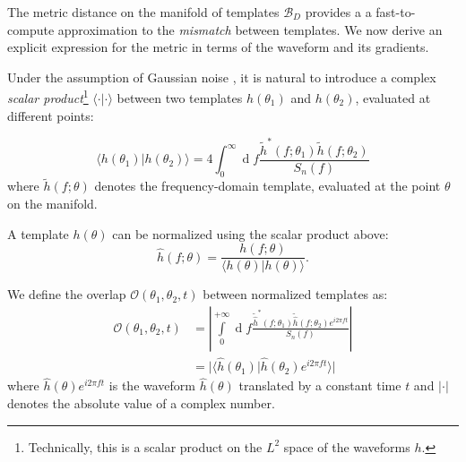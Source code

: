 \documentclass[twocolumn,showpacs,preprintnumbers,nofootinbib,prd,
superscriptaddress,10pt]{revtex4-2}
\renewcommand{\d}[1]{\ensuremath{\operatorname{d}\!{#1}}}
\newcommand{\scalar}[2]{\langle #1|#2 \rangle}
\begin{document}
The metric distance on the manifold of templates $\mathcal{B}_D$ provides a a fast-to-compute approximation to the {\it mismatch} between templates. We now derive an explicit expression for the metric in terms of the waveform and its gradients.

Under the assumption of Gaussian noise \cite{Creighton_book}, it is natural to introduce a complex \textit{scalar product}\footnote{
Technically, this is a scalar product on the $L^2$ space of the waveforms $h$.}
$\scalar{\cdot}{\cdot}$ between two templates $h(\theta_1)$ and $h(\theta_2)$, evaluated at different points:

\begin{equation} \label{eq:scalar_product}
	\scalar{h(\theta_1)}{h(\theta_2)} = 4 \int_{0}^{\infty} \d{f} \frac{\tilde{h}^*(f;\theta_1) \tilde{h}(f;\theta_2)}{S_n(f)}
\end{equation}
where $\tilde{h}(f; \theta)$ denotes the frequency-domain template, evaluated at the point $\theta$ on the manifold.

A template $h(\theta)$ can be normalized using the scalar product above:
\begin{equation} \label{eq:normalization}
	\hat{h}(f; \theta) = \frac{h(f; \theta)}{\scalar{h(\theta)}{h(\theta)}}.
\end{equation}


We define the overlap $\mathcal{O}(\theta_1,\theta_2, t)$ between normalized templates as:
\begin{align}\label{eq:overlap}
	\mathcal{O}(\theta_1,\theta_2, t) &= \left\lvert \int\limits_{0}^{+\infty} \d{f} \frac{\tilde{\hat{h}}^*(f;\theta_1)\tilde{\hat{h}}(f;\theta_2) e^{i2\pi ft}}{S_n(f)} \right\rvert \nonumber\\
	&= \lvert \scalar{\hat{h}(\theta_1)}{\hat{h}(\theta_2)e^{i 2\pi ft}} \rvert
\end{align}
where $\hat{h}(\theta)e^{i 2\pi ft}$ is the waveform $\hat{h}(\theta)$ translated by a constant time $t$ and $\lvert \cdot \rvert$ denotes the absolute value of a complex number.
\end{document}
